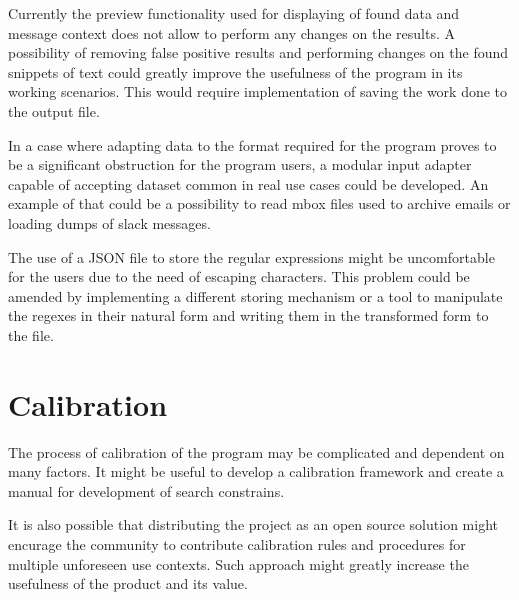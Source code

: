\documentclass[a4paper,twoside,12pt]{book}
\newcounter{PagesWithoutNumbers}
\begin{document}
Currently the preview functionality used for displaying of found data and message context 
does not allow to perform any changes on the results. A possibility of removing false positive 
results and performing changes on the found snippets of text could greatly improve the 
usefulness of the program in its working scenarios. This would require implementation of saving the work
done to the output file.

In a case where adapting data to the format required for the program proves to be a significant 
obstruction for the program users, a modular input adapter capable of accepting dataset common in 
real use cases could be developed. An example of that could be a possibility to read mbox files 
used to archive emails or loading dumps of slack messages.

The use of a JSON file to store the regular expressions might be uncomfortable for the users due to the need of escaping characters. 
This problem could be amended by implementing a different storing mechanism or a tool to manipulate the regexes in their natural form 
and writing them in the transformed form to the file. 

\section{Calibration}

The process of calibration of the program may be complicated and dependent on many factors. It might be 
useful to develop a calibration framework and create a manual for development of search constrains. 

It is also possible that distributing the project as an open source solution might encurage the community to
contribute calibration rules and procedures for multiple unforeseen use contexts. Such approach might greatly 
increase the usefulness of the product and its value.
 


\backmatter
{}
\setcounter{page}{\value{PagesWithoutNumbers}}

\pagestyle{onlyPageNumbers}




\end{document}
